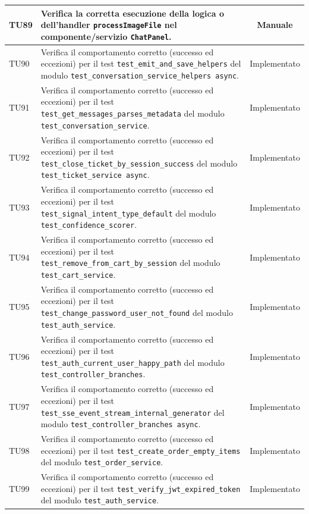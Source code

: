 \documentclass[a4paper,11pt,oneside]{scrartcl}
\begin{document}
\begin{longtable}{|p{1.9cm}|p{11.6cm}|c|}
    TU89 & Verifica la corretta esecuzione della logica o dell'handler \texttt{processImageFile} nel componente/servizio \texttt{ChatPanel}. & Manuale \\ \hline
    TU90 & Verifica il comportamento corretto (successo ed eccezioni) per il test \texttt{test\_emit\_and\_save\_helpers} del modulo \texttt{test\_conversation\_service\_helpers async}. & Implementato \\ \hline
    TU91 & Verifica il comportamento corretto (successo ed eccezioni) per il test \texttt{test\_get\_messages\_parses\_metadata} del modulo \texttt{test\_conversation\_service}. & Implementato \\ \hline
    TU92 & Verifica il comportamento corretto (successo ed eccezioni) per il test \texttt{test\_close\_ticket\_by\_session\_success} del modulo \texttt{test\_ticket\_service     async}. & Implementato \\ \hline
    TU93 & Verifica il comportamento corretto (successo ed eccezioni) per il test \texttt{test\_signal\_intent\_type\_default} del modulo \texttt{test\_confidence\_scorer}. & Implementato \\ \hline
    TU94 & Verifica il comportamento corretto (successo ed eccezioni) per il test \texttt{test\_remove\_from\_cart\_by\_session} del modulo \texttt{test\_cart\_service}. & Implementato \\ \hline
    TU95 & Verifica il comportamento corretto (successo ed eccezioni) per il test \texttt{test\_change\_password\_user\_not\_found} del modulo \texttt{test\_auth\_service}. & Implementato \\ \hline
    TU96 & Verifica il comportamento corretto (successo ed eccezioni) per il test \texttt{test\_auth\_current\_user\_happy\_path} del modulo \texttt{test\_controller\_branches}. & Implementato \\ \hline
    TU97 & Verifica il comportamento corretto (successo ed eccezioni) per il test \texttt{test\_sse\_event\_stream\_internal\_generator} del modulo \texttt{test\_controller\_branches async}. & Implementato \\ \hline
    TU98 & Verifica il comportamento corretto (successo ed eccezioni) per il test \texttt{test\_create\_order\_empty\_items} del modulo \texttt{test\_order\_service}. & Implementato \\ \hline
    TU99 & Verifica il comportamento corretto (successo ed eccezioni) per il test \texttt{test\_verify\_jwt\_expired\_token} del modulo \texttt{test\_auth\_service}. & Implementato \\ \hline

\end{longtable}
\end{document}
